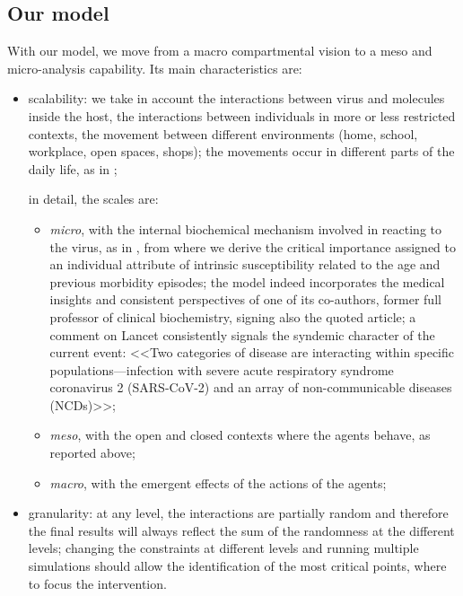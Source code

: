 \documentclass[graybox]{svmult}
\begin{document}
\subsection{Our model}
\label{ourModel}

With our model, we move from a macro compartmental vision to a meso and micro-analysis capability. Its main characteristics are:

\begin{itemize}

\item
scalability: we take in account the interactions between virus and molecules inside the host, the interactions between individuals in more or less restricted contexts, the movement between different environments (home, school, workplace, open spaces, shops); the movements occur in different parts of the daily life, as in \cite{ghorbani2020assocc};

in detail, the scales are: 

\begin{itemize}
\item
	\emph{micro}, with the internal biochemical mechanism involved in reacting to the virus, as in \cite{Silvagno_2020}, from where we derive the critical importance assigned to an individual attribute of intrinsic susceptibility related to the age and previous morbidity episodes; the model indeed incorporates the medical insights and consistent perspectives of one of its co-authors, former full professor of clinical biochemistry, signing also the quoted article; a comment on Lancet \cite{horton2020offline} consistently signals the syndemic character of the current event: <<Two categories of disease are interacting within specific populations---infection with severe acute respiratory syndrome coronavirus 2 (SARS-CoV-2) and an array of non-communicable diseases (NCDs)>>;
\item
	\emph{meso}, with the open and closed contexts where the agents behave, as reported above;
\item	
	\emph{macro}, with the emergent effects of the actions of the agents;
	
\end{itemize}

\item
granularity: at any level, the interactions are partially random and therefore the final results will always reflect the sum of the randomness at the different levels; changing the constraints at different levels and running multiple simulations should allow the identification of the most critical points, where to focus the intervention.

\end{itemize}
\end{document}

